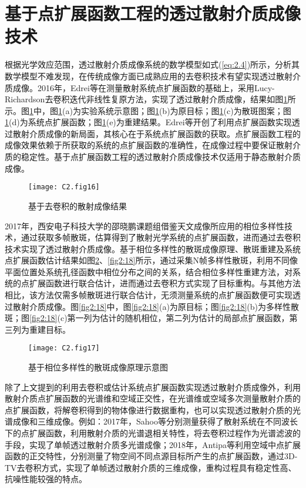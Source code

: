 \section{基于点扩展函数工程的透过散射介质成像技术}

根据光学效应范围，透过散射介质成像系统的数学模型如式(\ref{eq:2.4})所示，分析其数学模型不难发现，在传统成像方面已成熟应用的去卷积技术有望实现透过散射介质成像。2016年，Edrei等在测量散射系统点扩展函数的基础上，采用Lucy-Richardson去卷积迭代非线性复原方法，实现了透过散射介质成像，结果如图\ref{fig2:16}所示。图\ref{fig2:16}中，图\ref{fig2:16}(a)为实验系统示意图；图\ref{fig2:16}(b)为原目标；图\ref{fig2:16}(c)为散斑图案；图\ref{fig2:16}(d)为系统点扩展函数；图\ref{fig2:16}(e)为重建结果。Edrei等开创了利用点扩展函数实现透过散射介质成像的新局面，其核心在于系统点扩展函数的获取。点扩展函数工程的成像效果依赖于所获取的系统的点扩展函数的准确性，在成像过程中要保证散射介质的稳定性。基于点扩展函数工程的透过散射介质成像技术仅适用于静态散射介质成像。

\begin{figure}[htp]
	\centering
	\texttt{[image: C2.fig16]}
	\caption{基于去卷积的散射成像结果}
	\label{fig2:16}
\end{figure}

2017年，西安电子科技大学的邵晓鹏课题组借鉴天文成像所应用的相位多样性技术，通过获取多帧散斑，估算得到了散射光学系统的点扩展函数，进而通过去卷积技术实现了透过散射介质成像。基于相位多样性的散斑成像原理、散斑重建及系统点扩展函数估计结果如图\ref{fig2:17}、\ref{fig2:18}所示，通过采集N帧多样性散斑，利用不同像平面位置处系统孔径函数中相位分布之间的关系，结合相位多样性重建方法，对系统的点扩展函数进行联合估计，进而通过去卷积方式实现了目标重构。与其他方法相比，该方法仅需多帧散斑进行联合估计，无须测量系统的点扩展函数便可实现透过散射介质成像。图\ref{fig2:18}中，图\ref{fig2:18}(a)为原目标；图\ref{fig2:18}(b)为多样性散斑；图\ref{fig2:18}(c)第一列为估计的随机相位，第二列为估计的局部点扩展函数，第三列为重建目标。

\begin{figure}[htp]
	\centering
	\texttt{[image: C2.fig17]}
	\caption{基于相位多样性的散斑成像原理示意图}
	\label{fig2:17}
\end{figure}

除了上文提到的利用去卷积或估计系统点扩展函数实现透过散射介质成像外，利用散射介质点扩展函数的光谱维和空域正交性，在光谱维或空域多次测量散射介质的点扩展函数，将解卷积得到的物体像进行数据重构，也可以实现透过散射介质的光谱成像和三维成像。例如：2017年，Sahoo等分别测量获得了散射系统在不同波长下的点扩展函数，利用散射介质的光谱退相关特性，将去卷积过程作为光谱滤波的手段，实现了单帧透过散射介质多光谱成像；2018年，Antipa等利用空域中点扩展函数的正交特性，分别测量了物空间不同点源目标所产生的点扩展函数，通过3D-TV去卷积方式，实现了单帧透过散射介质的三维成像，重构过程具有稳定性高、抗噪性能较强的特点。

